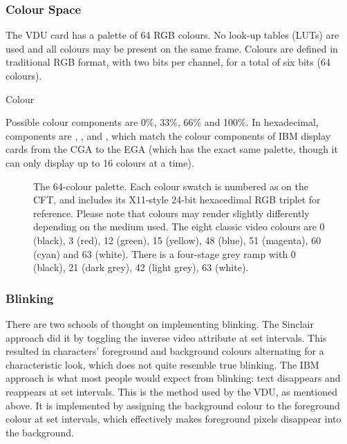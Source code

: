 \subsubsection{Colour Space}

The VDU card has a palette of 64 RGB colours. No look-up tables (LUTs)
are used and all colours may be present on the same frame. Colours are
defined in traditional RGB format, with two bits per channel, for a
total of six bits (64 colours).

\begin{nbitfield}{6}
\end{nbitfield}

\begin{datastructure}[Bits]{Colour}
\end{datastructure}

Possible colour components are 0\%, 33\%, 66\% and 100\%. In hexadecimal,
components are , ,  and , which match the
colour components of IBM display cards from the CGA to the EGA (which has the
exact same palette, though it can only display up to 16 colours at a time).

\begin{figure}
 \centering
 \caption[The 64-colour palette]{\label{fig:vdu-colour-palette} The 64-colour
   palette. Each colour swatch is numbered as on the CFT, and includes its
   X11-style 24-bit hexacedimal RGB triplet for reference. Please note that
   colours may render slightly differently depending on the medium used. The
   eight classic video colours are 0 (black), 3 (red), 12 (green), 15 (yellow),
   48 (blue), 51 (magenta), 60 (cyan) and 63 (white). There is a four-stage
   grey ramp with 0 (black), 21 (dark grey), 42 (light grey), 63 (white).}
\end{figure}


\subsubsection{Blinking}

There are two schools of thought on implementing blinking. The Sinclair
approach did it by toggling the inverse video attribute at set intervals. This
resulted in characters' foreground and background colours alternating for a
characteristic look, which does not quite resemble true blinking. The IBM
approach is what most people would expect from blinking: text disappears and
reappears at set intervals. This is the method used by the VDU, as mentioned
above. It is implemented by assigning the background colour to the foreground
colour at set intervals, which effectively makes foreground pixels disappear
into the background.

